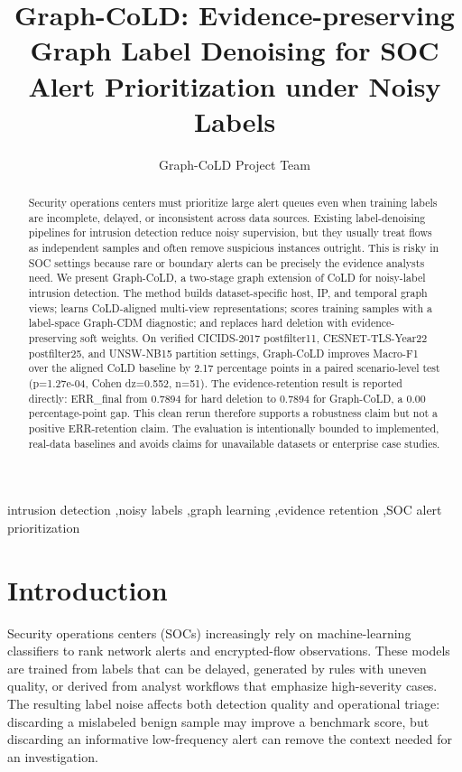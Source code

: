 \documentclass[preprint,review,12pt]{elsarticle}
\title{Graph-CoLD: Evidence-preserving Graph Label Denoising for SOC Alert Prioritization under Noisy Labels}
\author{Graph-CoLD Project Team}
\begin{document}
\begin{frontmatter}
\maketitle
\begin{abstract}
Security operations centers must prioritize large alert queues even when training
labels are incomplete, delayed, or inconsistent across data sources. Existing
label-denoising pipelines for intrusion detection reduce noisy supervision, but
they usually treat flows as independent samples and often remove suspicious
instances outright. This is risky in SOC settings because rare or boundary
alerts can be precisely the evidence analysts need. We present Graph-CoLD, a
two-stage graph extension of CoLD for noisy-label intrusion detection. The method
builds dataset-specific host, IP, and temporal graph views; learns CoLD-aligned
multi-view representations; scores training samples with a label-space
Graph-CDM diagnostic; and replaces hard deletion with evidence-preserving soft
weights. On verified CICIDS-2017 postfilter11, CESNET-TLS-Year22 postfilter25,
and UNSW-NB15 partition settings, Graph-CoLD improves Macro-F1 over the aligned
CoLD baseline by
2.17 percentage points in a paired scenario-level test
(p=1.27e-04, Cohen dz=0.552,
n=51). The evidence-retention result is reported directly:
ERR\_final from 0.7894 for hard deletion to
0.7894 for Graph-CoLD, a 0.00
percentage-point gap. This clean rerun therefore supports a robustness claim
but not a positive ERR-retention claim. The evaluation is intentionally bounded
to implemented, real-data baselines and avoids claims for unavailable datasets
or enterprise case studies.
\end{abstract}
\begin{keyword}
intrusion detection \sep noisy labels \sep graph learning \sep evidence retention \sep SOC alert prioritization
\end{keyword}
\end{frontmatter}

\section{Introduction}
Security operations centers (SOCs) increasingly rely on machine-learning
classifiers to rank network alerts and encrypted-flow observations. These models
are trained from labels that can be delayed, generated by rules with uneven
quality, or derived from analyst workflows that emphasize high-severity cases.
The resulting label noise affects both detection quality and operational triage:
discarding a mislabeled benign sample may improve a benchmark score, but
discarding an informative low-frequency alert can remove the context needed for
an investigation.
\end{document}
